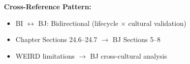 \begin{tcolorbox}[colback=green!5!white, colframe=green!75!black, title=Appendix Ecosystem for Chapter 24]
\textbf{Cross-Reference Pattern:}
\begin{itemize}[nosep]
\item BI $\leftrightarrow$ BJ: Bidirectional (lifecycle $\times$ cultural validation)
\item Chapter Sections 24.6--24.7 $\rightarrow$ BJ Sections 5--8
\item WEIRD limitations $\rightarrow$ BJ cross-cultural analysis
\end{itemize}

\end{tcolorbox}


